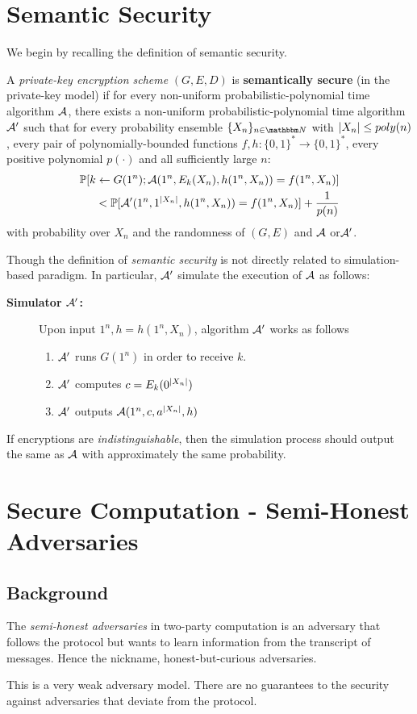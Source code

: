 \section{Semantic Security}
We begin by recalling the definition of semantic security.
\begin{definition} A {\it private-key encryption scheme} $(G,E,D)$ is {\bf semantically secure} (in the private-key model) if for every non-uniform probabilistic-polynomial time algorithm $\mathcal{A}$, there exists a non-uniform probabilistic-polynomial time algorithm $\mathcal{A}'$ such that for every probability ensemble $\{X_n\}_{n\in\N}$ with $\left|X_n\right|\leq poly(n)$, every pair of polynomially-bounded functions $f,h:\{0,1\}^*\to\{0,1\}^*$, every positive polynomial $p(\cdot)$ and all sufficiently large $n$:
\begin{align*}
    \mathop{\mathbb P\/}[k\leftarrow G(1^n);\mathcal{A}(1^n,E_k(X_n), h(1^n,X_n)) = f(1^n, X_n)] \\
    < \mathop{\mathbb P\/}[\mathcal{A}'(1^n,1^{\left|X_n\right|}, h(1^n,X_n)) = f(1^n,X_n) ]+ \frac{1}{p(n)}
\end{align*}
with probability over $X_n$ and the randomness of $(G,E)$ and $\mathcal{A}$ or$\mathcal{A}'$.
\end{definition}
Though the definition of {\it semantic security} is not directly related to simulation-based paradigm. In particular, $\mathcal{A}'$ simulate the execution of $\mathcal{A}$ as follows:
\begin{description}
    \item [\bf Simulator $\mathcal{A}'$:] Upon input $1^n,h=h(1^n,X_n)$, algorithm $\mathcal{A}'$ works as follows
    \begin{enumerate}
        \item $\mathcal{A}'$ runs $G(1^n)$ in order to receive $k$.
        \item $\mathcal{A}'$ computes $c=E_k(0^{\left|X_n\right|})$
        \item $\mathcal{A}'$ outputs $\mathcal{A}(1^n,c,a^{\left|X_n\right|},h)$
    \end{enumerate}
\end{description}
If encryptions are {\it indistinguishable}, then the simulation process should output the same as $\mathcal{A}$ with approximately the same probability.
\section{Secure Computation - Semi-Honest Adversaries}
\subsection{Background}
The {\it semi-honest adversaries} in two-party computation is an adversary that follows the protocol but wants to learn information from the transcript of messages. Hence the nickname, honest-but-curious adversaries. 
\begin{remark}
    This is a very weak adversary model. There are no guarantees to the security against adversaries that deviate from the protocol.
\end{remark}

